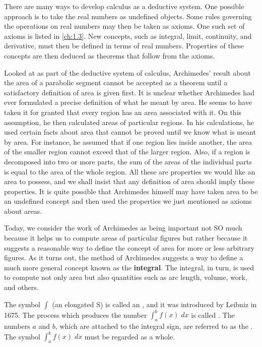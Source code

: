 \begin{note}
  There are many ways to develop calculus as a deductive system.
  One possible approach is to take the real numbers as undefined objects.
  Some rules governing the operations on real numbers may then be taken as axioms.
  One such set of axioms is listed in \cref{ch:1.3}.
  New concepts, such as integral, limit, continuity, and derivative, must then be defined in terms of real numbers.
  Properties of these concepts are then deduced as theorems that follow from the axioms.

  Looked at as part of the deductive system of calculus, Archimedes' result about the area of a parabolic segment cannot be accepted as a theorem until a satisfactory definition of area is given first.
  It is unclear whether Archimedes had ever formulated a precise definition of what he meant by area.
  He seems to have taken it for granted that every region has an area associated with it.
  On this assumption, he then calculated areas of particular regions.
  In his calculations, he used certain facts about area that cannot be proved until we know what is meant by area.
  For instance, he assumed that if one region lies inside another, the area of the smaller region cannot exceed that of the larger region.
  Also, if a region is decomposed into two or more parts, the sum of the areas of the individual parts is equal to the area of the whole region.
  All these are properties we would like an area to possess, and we shall insist that any definition of area should imply these properties.
  It is quite possible that Archimedes himself may have taken area to be an undefined concept and then used the properties we just mentioned as axioms about areas.

  Today, we consider the work of Archimedes as being important not SO much because it helps us to compute areas of particular figures but rather because it suggests a reasonable way to define the concept of area for more or less arbitrary figures.
  As it turns out, the method of Archimedes suggests a way to define a much more general concept known as the \textbf{integral}.
  The integral, in turn, is used to compute not only area but also quantities such as arc length, volume, work, and others.

  The symbol \(\int\) (an elongated S) is called an \textbf{}, and it was introduced by Leibniz in 1675.
  The process which produces the number \(\int_a^b f(x) \; dx\) is called \textbf{}.
  The numbers \(a\) and \(b\), which are attached to the integral sign, are referred to as the \textbf{}.
  The symbol \(\int_a^b f(x) \; dx\) must be regarded as a whole.


\end{note}
